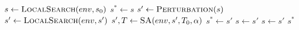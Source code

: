 \documentclass[10pt]{article}
\theoremstyle{definition}
\begin{document}
\begin{algorithm}[t]
\caption{ILS + SA Post-Processor}
\label{alg:ils-sa}
\begin{algorithmic}[1]
  \State $s \gets \textsc{LocalSearch}(env, s_0)$
  \State $s^* \gets s$
    \State $s' \gets \textsc{Perturbation}(s)$  
    \State $s' \gets \textsc{LocalSearch}(env, s')$
    \State $s', T \gets \textsc{SA}(env, s', T_0, \alpha)$
      \State $s^* \gets s'$
      \State $s \gets s'$
      \State $s \gets s'$
    \EndIf
  \EndFor
  \State \Return $s^*$
\EndFunction
\end{algorithmic}
\end{algorithm}
\end{document}
